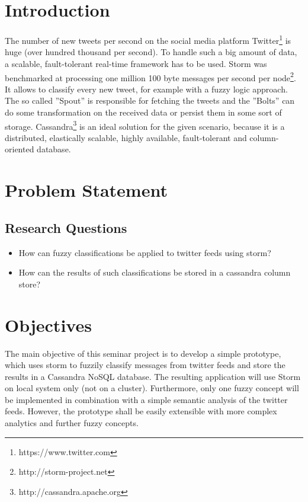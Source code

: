 \documentclass[a4paper]{article}
\begin{document}
  





\pagestyle{plain}
\newpage

\tableofcontents
\newpage

\section{Introduction}

The number of new tweets per second on the social media platform Twitter\footnote{https://www.twitter.com} is huge (over hundred thousand per second). To handle such a big amount of data, a scalable, fault-tolerant real-time framework has to be used. Storm was benchmarked at processing one million 100 byte messages per second per node\footnote{http://storm-project.net}. It allows to classify every new tweet, for example with a fuzzy logic approach. The so called ''Spout'' is responsible for fetching the tweets and the ''Bolts'' can do some transformation on the received data or persist them in some sort of storage. Cassandra\footnote{http://cassandra.apache.org} is an ideal solution for the given scenario, because it is a distributed, elastically scalable, highly available, fault-tolerant and column-oriented database.

\section{Problem Statement}

\subsection{Research Questions}
\vspace{0.5cm}
\begin{itemize}
\item How can fuzzy classifications be applied to twitter feeds using storm?
\item How can the results of such classifications be stored in a cassandra column store?
\end{itemize}



\section{Objectives}

The main objective of this seminar project is to develop a simple prototype, which uses storm to fuzzily classify messages from twitter feeds and store the results in a Cassandra NoSQL database.
The resulting application will use Storm on local system only (not on a cluster). Furthermore, only one fuzzy concept will be implemented in combination with a simple semantic analysis of the twitter feeds. However, the prototype shall be easily extensible with more complex analytics and further fuzzy concepts.
\end{document}
